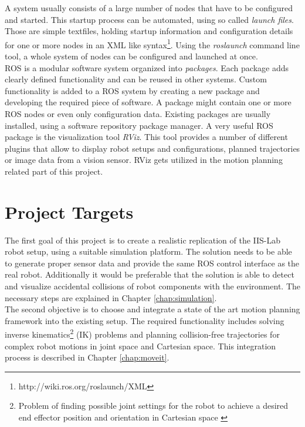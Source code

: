 A system usually consists of a large number of nodes that have to be configured and started. This startup process can be automated, using so called \emph{launch files}. Those are simple textfiles, holding startup information and configuration details for one or more nodes in an XML like syntax\footnote{http://wiki.ros.org/roslaunch/XML}. Using the \emph{roslaunch} command line tool, a whole system of nodes can be configured and launched at once. \\

ROS is a modular software system organized into \emph{packages}. Each package adds clearly defined functionality and can be reused in other systems. Custom functionality is added to a ROS system by creating a new package and developing the required piece of software. A package might contain one or more ROS nodes or even only configuration data. Existing packages are usually installed, using a software repository package manager. A very useful ROS package is the visualization tool \emph{RViz}. This tool provides a number of different plugins that allow to display robot setups and configurations, planned trajectories or image data from a vision sensor. RViz gets utilized in the motion planning related part of this project.

\section{Project Targets}

The first goal of this project is to create a realistic replication of the IIS-Lab robot setup, using a suitable simulation platform. The solution needs to be able to generate proper sensor data and provide the same ROS control interface as the real robot. Additionally it would be preferable that the solution is able to detect and visualize accidental collisions of robot components with the environment. The necessary steps are explained in Chapter \ref{chap:simulation}.\\

The second objective is to choose and integrate a state of the art motion planning framework into the existing setup. The required functionality includes solving inverse kinematics\footnote{Problem of finding possible joint settings for the robot to achieve a desired end effector position and orientation in Cartesian space \citep{craig2005}} (IK) problems and planning collision-free trajectories for complex robot motions in joint space and Cartesian space. This integration process is described in Chapter \ref{chap:moveit}. \\

